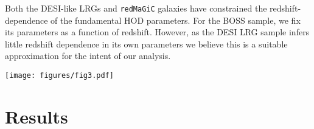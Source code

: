 \documentclass[fleqn,usenatbib]{mnras}
\newcommand{\redmagic}{\texttt{redMaGiC} }
\newcommand{\ihmpc}{\,h{\rm Mpc}^{-1}}
\begin{document}
Both the DESI-like LRGs and \redmagic galaxies have constrained the redshift-dependence of the fundamental HOD parameters. For the BOSS sample, we fix its parameters as a function of redshift. However, as the DESI LRG sample infers little redshift dependence in its own parameters we believe this is a suitable approximation for the intent of our analysis. \par
\begin{figure*}
    \centering
    \texttt{[image: figures/fig3.pdf]}
    \caption{Error power spectra for the different samples, for the standard Lagrangian bias basis, using bias parameters inferred from our variance-minimization procedure assuming $k_{\rm max} = 0.4 \ihmpc $. The envelopes are the scatter found from the five independent realizations from the Aemulus suite at this cosmology.  The vertical dashed line corresponds to the inverse grid size, $L_{\rm cell}^{-1} \approx 1.33 \ihmpc$. Note that at low redshifts the $y$-axis ranges are altered to accommodate for the large amount of super-Poisson stochasticity observed in the \redmagic sample.}
    \label{fig:hod_perr}
\end{figure*}
\section{Results}
\label{sec:results}
\end{document}
